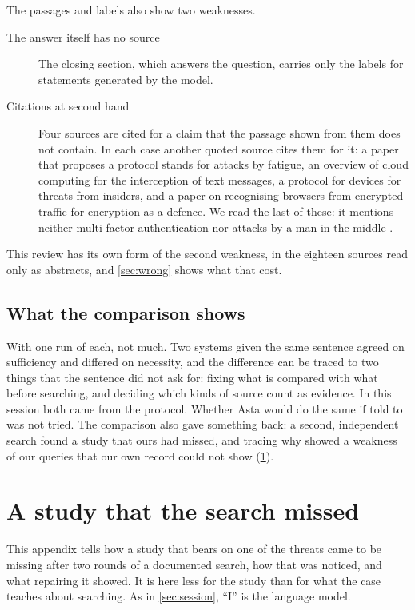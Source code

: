 \begin{refsection}
The passages and labels also show two weaknesses.
\begin{description}
  \item[The answer itself has no source] The closing section, which
    answers the question, carries only the labels for statements
    generated by the model.
  \item[Citations at second hand] Four sources are cited for a claim
    that the passage shown from them does not contain.
    In each case another quoted source cites them for it: a paper that
    proposes a protocol stands for attacks by fatigue, an overview of
    cloud computing for the interception of text messages, a protocol
    for devices for threats from insiders, and a paper on recognising
    browsers from encrypted traffic for encryption as a defence.
    We read the last of these: it mentions neither multi-factor
    authentication nor attacks by a man in the middle
    \autocite{Husak2016HTTPS}.
\end{description}
This review has its own form of the second weakness, in the eighteen
sources read only as abstracts, and \cref{sec:wrong} shows what that
cost.

\subsection{What the comparison shows}

With one run of each, not much.
Two systems given the same sentence agreed on sufficiency and differed
on necessity, and the difference can be traced to two things that the
sentence did not ask for: fixing what is compared with what before
searching, and deciding which kinds of source count as evidence.
In this session both came from the protocol.
Whether Asta would do the same if told to was not tried.
The comparison also gave something back: a second, independent search
found a study that ours had missed, and tracing why showed a weakness
of our queries that our own record could not show
(\cref{sec:missed}).

\printbibliography[heading=subbibliography,title={Sources cited in this appendix}]
\end{refsection}


\section{A study that the search missed}\label{sec:missed}

This appendix tells how a study that bears on one of the threats came
to be missing after two rounds of a documented search, how that was
noticed, and what repairing it showed.
It is here less for the study than for what the case teaches about
searching.
As in \cref{sec:session}, \enquote{I} is the language model.

